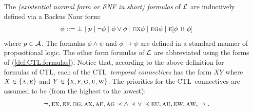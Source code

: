 \documentclass[runningheads]{llncs}
\newcommand{\rto}{\rightarrow}
\newcommand{\CTL}{\textrm{CTL}}
\newcommand{\ALL}{\textsc{a}}
\newcommand{\EXIST}{\textsc{e}}
\newcommand{\NEXT}{\textsc{x}}
\newcommand{\FUTURE}{\textsc{f}}
\newcommand{\UNTIL}{\textsc{u}}
\newcommand{\GLOBAL}{\textsc{g}}
\newcommand{\UNLESS}{\textsc{w}}
\newcommand{\Def}{\textrm{def}}
\begin{document}
The {\em (existential normal form or ENF in short) formulas} of
$\cal L$ are inductively defined via a Backus Naur form:
\begin{equation}\label{def:CTL:formulas}
  \phi ::= \bot\mid p \mid\neg\phi \mid \phi\lor\phi \mid
    \EXIST \NEXT \phi \mid
    \EXIST \GLOBAL \phi \mid
    \EXIST [\phi\ \UNTIL\ \phi]%
\end{equation}
where $p\in\cal A$. The formulas $\phi\land\psi$ and $\phi\rto\psi$
are defined in a standard manner of propositional logic.
The other form formulas of $\cal L$ are abbreviated
using the forms of (\ref{def:CTL:formulas}).
Notice that, according to the
above definition for formulas of \CTL,
each of the \CTL\ {\em temporal connectives} has the form $XY$
where $X\in \{\ALL,\EXIST\}$ and  $Y\in\{\NEXT, \FUTURE, \GLOBAL, \UNTIL, \UNLESS\}$.
The priorities for the \CTL\ connectives are assumed to be (from the highest to the lowest):
\begin{equation*}
  \neg, \EXIST\NEXT, \EXIST\FUTURE, \EXIST\GLOBAL, \ALL\NEXT, \ALL\FUTURE, \ALL\GLOBAL
  \prec \land \prec \lor \prec \EXIST\UNTIL, \ALL\UNTIL, \EXIST \UNLESS, \ALL \UNLESS, \rto.
\end{equation*}
\end{document}
